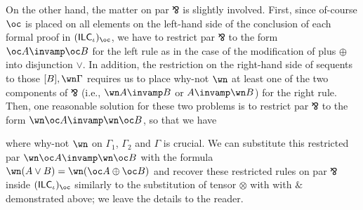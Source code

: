 \documentclass[a4paper]{article}
\theoremstyle{definition}
\theoremstyle{theorem}
\theoremstyle{remark}
\begin{document}
On the other hand, the matter on par $\invamp$ is slightly involved.
First, since of-course $\oc$ is placed on all elements on the left-hand side of the conclusion of each formal proof in $(\textsf{ILC$_\iota$})_\oc$, we have to restrict par $\invamp$ to the form $\oc A \invamp \oc B$ for the left rule as in the case of the modification of plus $\oplus$ into disjunction $\vee$.
In addition, the restriction on the right-hand side of sequents to those $[B], \wn \Gamma$ requires us to place why-not $\wn$ at least one of the two components of $\invamp$ (i.e., $\wn A \invamp B$ or $A \invamp \wn B$) for the right rule.
Then, one reasonable solution for these two problems is to restrict par $\invamp$ to the form $\wn \oc A \invamp \wn \oc B$, so that we have
\begin{mathpar}
\end{mathpar}
where why-not $\wn$ on $\Gamma_1$, $\Gamma_2$ and $\Gamma$ is crucial.
We can substitute this restricted par $\wn \oc A \invamp \wn \oc B$ with the formula $\wn (A \vee B) = \wn (\oc A \oplus \oc B)$ and recover these restricted rules on par $\invamp$ inside $(\textsf{ILC$_\iota$})_\oc$ similarly to the substitution of tensor $\otimes$ with with $\&$ demonstrated above; we leave the details to the reader.
\end{document}
